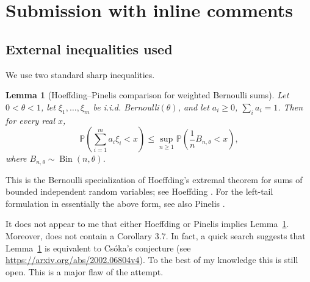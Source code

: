 \documentclass[12pt]{article}
\newtheorem{lemma}{Lemma}
\DeclareMathOperator{\Bin}{Bin}
\newcommand{\review}[1]{\begin{reviewbox}#1\end{reviewbox}}
\begin{document}
  \section{Submission with inline comments}


\date{}

\begin{abstract}
We determine all \(p\in[0,1]\) such that, for every finite probability vector
\((w_1,\ldots,w_m)\) and i.i.d. Bernoulli\((p)\) random variables
\(v_1,\ldots,v_m\), one has
\[
\mathbb P\!\left(\sum_{i=1}^m w_i v_i\ge p\right)\ge p.
\]
The answer is
\[
\boxed{\,p\in[0,1/3]\cup\{1/2,1\}\, }.
\]
\end{abstract}

\subsection*{External inequalities used}

We use two standard sharp inequalities.

\begin{lemma}[Hoeffding--Pinelis comparison for weighted Bernoulli sums]
\label{lem:hoeffding}
Let \(0<\theta<1\), let \(\xi_1,\ldots,\xi_m\) be i.i.d. Bernoulli\((\theta)\), and let
\(a_i\ge0\), \(\sum_i a_i=1\). Then for every real \(x\),
\[
\mathbb P\!\left(\sum_{i=1}^m a_i\xi_i<x\right)
\le
\sup_{n\ge1}
\mathbb P\!\left(\frac1n B_{n,\theta}<x\right),
\]
where \(B_{n,\theta}\sim \Bin(n,\theta)\).
\end{lemma}

This is the Bernoulli specialization of Hoeffding's extremal theorem for sums of
bounded independent random variables; see Hoeffding \cite[Theorem 4]{Hoeffding1956}.
For the left-tail formulation in essentially the above form, see also Pinelis
\cite[Corollary 3.7]{Pinelis2016}. 

\review{It does not appear to me that either Hoeffding \cite{Hoeffding1956} or Pinelis \cite{Pinelis2016} implies Lemma~\ref{lem:hoeffding}. Moreover, \cite{Pinelis2016} does not contain a Corollary 3.7. In fact, a quick search suggests that Lemma~\ref{lem:hoeffding} is equivalent to Cs{\'o}ka's conjecture (see \url{https://arxiv.org/abs/2002.06804v4}). To the best of my knowledge this is still open. This is a major flaw of the attempt.}
\end{document}
